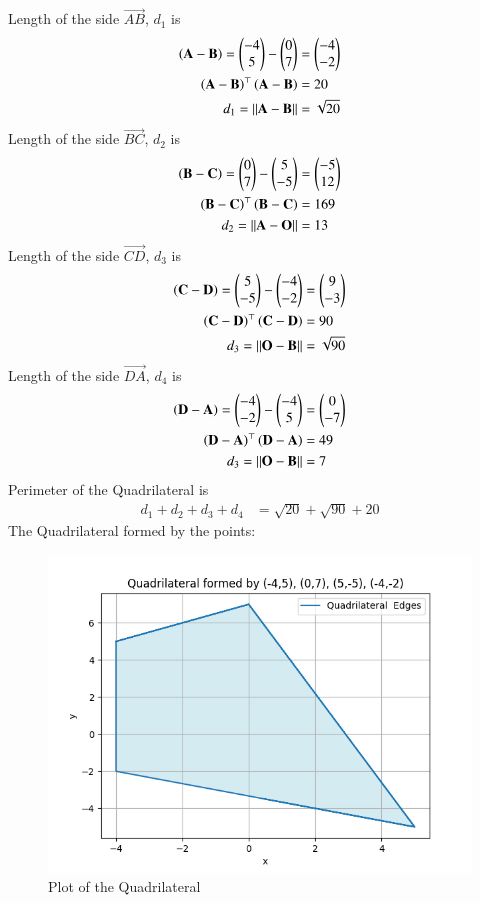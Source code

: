 \documentclass[journal]{IEEEtran}
\begin{document}
Length of the side $\vec{AB}$, $d_1$ is
\begin{align}
	\left(\mathbf{A} - \mathbf{B}\right) = \begin{pmatrix}-4\\5\end{pmatrix} - \begin{pmatrix}0\\7\end{pmatrix} &= \begin{pmatrix}-4\\-2\end{pmatrix}\\
	\left(\mathbf{A-B}\right)^\top\left(\mathbf{A-B}\right)&=20\\
    d_1=||\mathbf{A}-\mathbf{B}||&=\sqrt{20}
\end{align}
Length of the side $\vec{BC}$, $d_2$ is
\begin{align}
	\left(\mathbf{B} - \mathbf{C}\right) = \begin{pmatrix}0\\7\end{pmatrix} - \begin{pmatrix}5\\-5\end{pmatrix} &= \begin{pmatrix}-5\\12\end{pmatrix}\\
	\left(\mathbf{B-C}\right)^\top\left(\mathbf{B-C}\right)&=169\\
    d_2=||\mathbf{A}-\mathbf{O}||&=13
\end{align}
Length of the side $\vec{CD}$, $d_3$ is
\begin{align}
	\left(\mathbf{C} - \mathbf{D}\right) = \begin{pmatrix}5\\-5\end{pmatrix} - \begin{pmatrix}-4\\-2\end{pmatrix} &= \begin{pmatrix}9\\-3\end{pmatrix}\\
	\left(\mathbf{C-D}\right)^\top\left(\mathbf{C-D}\right)&=90\\
    d_3=||\mathbf{O}-\mathbf{B}||&=\sqrt{90}
\end{align}
Length of the side $\vec{DA}$, $d_4$ is
\begin{align}
	\left(\mathbf{D} - \mathbf{A}\right) = \begin{pmatrix}-4\\-2\end{pmatrix} - \begin{pmatrix}-4\\5\end{pmatrix} &= \begin{pmatrix}0\\-7\end{pmatrix}\\
	\left(\mathbf{D-A}\right)^\top\left(\mathbf{D-A}\right)&=49\\
    d_3=||\mathbf{O}-\mathbf{B}||&=7
\end{align}
Perimeter of the Quadrilateral is 
\begin{align}
    d_1+d_2+d_3+d_4&=\sqrt{20}+\sqrt{90}+20
\end{align}
The Quadrilateral formed by the points:
\begin{figure}[h!]
   \centering
   \includegraphics[width=0.7\linewidth]{figs/fig.png}
   \caption{Plot of the Quadrilateral}
   \label{stemplot}
\end{figure}  
\end{document}
